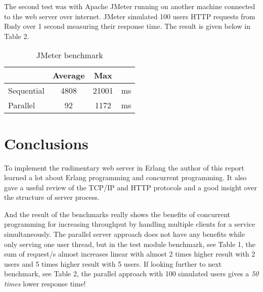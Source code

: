 \documentclass[a4paper, 11pt]{article}
\begin{document}
The second test was with Apache JMeter running on another machine connected to the web server over internet. JMeter simulated 100 users HTTP requests from Rudy over 1 second measuring their response time. The result is given below in Table 2.
\begin{table}[h]
\centering
\begin{tabular}{lccc}
& Average & Max &\\
\hline
Sequential & 4808 & 21001 & ms\\
\hline
Parallel & 92 & 1172 & ms\\
\hline
\end{tabular}
\caption{JMeter benchmark}
\label{tab:results}
\end{table}

\section{Conclusions}

To implement the rudimentary web server in Erlang the author of this report learned a lot about Erlang programming and concurrent programming. It also gave a useful review of the TCP/IP and HTTP protocols and a good insight over the structure of server process.

And the result of the benchmarks really shows the benefits of concurrent programming for increasing throughput by handling multiple clients for a service simultaneously. The parallel server approach does not have any benefits while only serving one user thread, but in the test module benchmark, see Table 1, the sum of request/s almost increases linear with almost 2 times higher result with 2 users and 5 times higher result with 5 users. If looking further to next benchmark, see Table 2, the parallel approach with 100 simulated users gives a \textit{50 times} lower response time!
\end{document}
